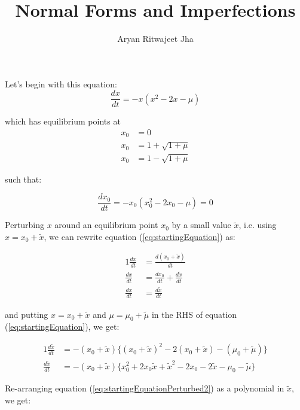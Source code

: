 \documentclass{article}
\begin{document}
	\title{Normal Forms and Imperfections}
	\author{Aryan Ritwajeet Jha}
	\maketitle
	
	Let's begin with this equation: 
	\begin{equation}
		\label{eq:startingEquation}
		\frac{dx}{dt} = -x(x^2-2x-\mu)
	\end{equation}
	
	which has equilibrium points at	
	\begin{align*}
		x_0 &= 0 \\
		x_0 &= 1 +\sqrt{1+\mu} \\
		x_0 &= 1 -\sqrt{1+\mu}
	\end{align*} 
	
	such that:
	
	\begin{equation}
		\label{eq:startingEquationEqui}
		\frac{dx_0}{dt} = -x_0(x_0^2-2x_0-\mu) = 0 
	\end{equation}
	
	
	Perturbing $x$ around an equilibrium point $x_0$ by a small value $\tilde x$, i.e. using $x = x_0 + \tilde x$, we can rewrite equation (\ref{eq:startingEquation}) as:
	
	\begin{alignat}{1}
		\label{eq:saddleNodePerturbed}
		\frac{dx}{dt} &= \frac{d(x_0 + \tilde x)}{dt} \nonumber \\
		\frac{dx}{dt} &= \frac{dx_0}{dt} + \frac{d \tilde x}{dt} \\
		\frac{dx}{dt} &= \frac{d \tilde x}{dt} \nonumber
	\end{alignat}
	
	and putting $x = x_0 + \tilde x$ and $\mu = \mu_0 + \tilde{\mu}$ in the RHS of equation (\ref{eq:startingEquation}), we get:
	
	\begin{alignat}{1}
		\label{eq:startingEquationPerturbed2}
		\frac{d\tilde x}{dt} &= -(x_0+\tilde{x})\{(x_0+\tilde{x})^2-2(x_0+\tilde{x})-(\mu_0+\tilde{\mu})\} \nonumber \\
		\frac{d\tilde x}{dt} &= -(x_0+\tilde{x})\{x_0^2 + 2x_0\tilde{x} +\tilde{x}^2 -2x_0 -2\tilde{x}-\mu_0 -\tilde{\mu}\}
	\end{alignat}

Re-arranging equation (\ref{eq:startingEquationPerturbed2}) as a polynomial in $\tilde{x}$, we get:
\end{document}
